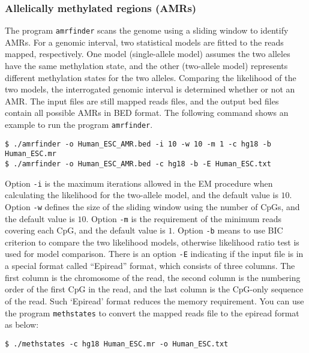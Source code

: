 \documentclass[10pt]{article}
\newcommand{\prog}[1]{\texttt{#1}}
\newcommand{\op}[1]{\texttt{#1}}
\begin{document}
\subsubsection{Allelically methylated regions (AMRs)}
The program \prog{amrfinder} scans the genome using a
sliding window to identify AMRs. For a genomic interval, two
statistical models are fitted to the reads mapped, respectively. One
model (single-allele model) assumes the two alleles have the same
methylation state, and the other (two-allele model) represents
different methylation states for the two alleles. Comparing the
likelihood of the two models, the interrogated genomic interval is
determined whether or not an AMR. The input files are still mapped reads files, and the output bed files contain all
possible AMRs in BED format. The following command shows an
example to run the program \prog{amrfinder}.
\begin{verbatim}
$ ./amrfinder -o Human_ESC_AMR.bed -i 10 -w 10 -m 1 -c hg18 -b Human_ESC.mr
$ ./amrfinder -o Human_ESC_AMR.bed -c hg18 -b -E Human_ESC.txt
\end{verbatim}
Option \op{-i} is the maximum iterations
allowed in the EM procedure when calculating the likelihood for the
two-allele model, and the default value is $10$. Option \op{-w}
defines the size of the sliding window using the number of
CpGs, and the default value is $10$. Option \op{-m} is the requirement of the minimum reads covering
each CpG, and the default value is $1$. Option \op{-b} means to use
BIC criterion to compare the two likelihood models, otherwise likelihood ratio test is used for model comparison. There is an option
\op{-E} indicating if the input file is in a special format called
``Epiread'' format, which consists of three columns. The first column
is the chromosome of the read, the second column is the numbering order
of the first CpG in the read, and the last column is the CpG-only
sequence of the read. Such `Epiread' format reduces the memory
requirement. You can use the program \prog{methstates} to convert the
mapped reads file to the epiread format as below:
\begin{verbatim}
$ ./methstates -c hg18 Human_ESC.mr -o Human_ESC.txt
\end{verbatim}



\end{document}
